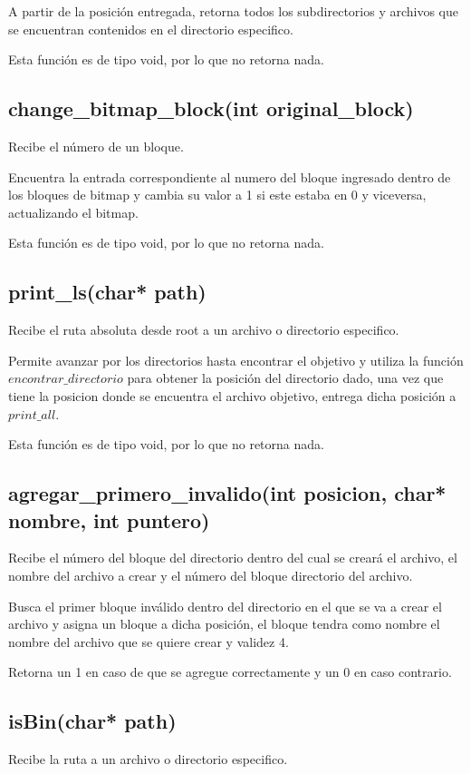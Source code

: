 \documentclass[12pt]{article}
\begin{document}
A partir de la posición entregada, retorna todos los subdirectorios y archivos que se encuentran contenidos en el directorio especifico.

Esta función es de tipo void, por lo que no retorna nada.

\subsection{change\_bitmap\_block(int original\_block)}
Recibe el número de un bloque.

Encuentra la entrada correspondiente al numero del bloque ingresado dentro de los bloques de bitmap y cambia su valor a 1 si este estaba en 0 y viceversa, actualizando el bitmap.

Esta función es de tipo void, por lo que no retorna nada.

\subsection{print\_ls(char* path)}
Recibe el ruta absoluta desde root a un archivo o directorio especifico.

Permite avanzar por los directorios hasta encontrar el objetivo y utiliza la función $encontrar\_directorio$ para obtener la posición del directorio dado, una vez que tiene la posicion donde se encuentra el archivo objetivo, entrega dicha posición a $print\_all$.

Esta función es de tipo void, por lo que no retorna nada.

\subsection{agregar\_primero\_invalido(int posicion, char* nombre, int puntero)}
Recibe el número del bloque del directorio dentro del cual se creará el archivo, el nombre del archivo a crear y el número del bloque directorio del archivo.

Busca el primer bloque inválido dentro del directorio en el que se va a crear el archivo y asigna un bloque a dicha posición, el bloque tendra como nombre el nombre del archivo que se quiere crear y validez 4.

Retorna un 1 en caso de que se agregue correctamente y un 0 en caso contrario.

\subsection{isBin(char* path)}
Recibe la ruta a un archivo o directorio especifico.
\end{document}
